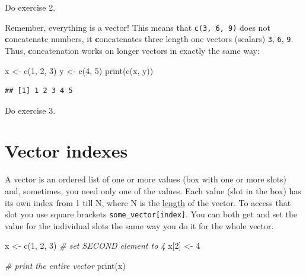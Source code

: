 \documentclass[
]{book}
\newenvironment{Shaded}{\begin{snugshade}}{\end{snugshade}}
\newcommand{\CommentTok}[1]{\textcolor[rgb]{0.56,0.35,0.01}{\textit{#1}}}
\newcommand{\DecValTok}[1]{\textcolor[rgb]{0.00,0.00,0.81}{#1}}
\newcommand{\FunctionTok}[1]{\textcolor[rgb]{0.00,0.00,0.00}{#1}}
\newcommand{\NormalTok}[1]{#1}
\newcommand{\OtherTok}[1]{\textcolor[rgb]{0.56,0.35,0.01}{#1}}
\begin{document}
Do exercise 2.

Remember, everything is a vector! This means that \texttt{c(3,\ 6,\ 9)} does not \textbf{c}oncatenate numbers, it \textbf{c}oncatenates three length one vectors (scalars) \texttt{3}, \texttt{6}, \texttt{9}. Thus, \textbf{c}oncatenation works on longer vectors in exactly the same way:

\begin{Shaded}
\begin{Highlighting}[]
\NormalTok{x }\OtherTok{\textless{}{-}} \FunctionTok{c}\NormalTok{(}\DecValTok{1}\NormalTok{, }\DecValTok{2}\NormalTok{, }\DecValTok{3}\NormalTok{)}
\NormalTok{y }\OtherTok{\textless{}{-}} \FunctionTok{c}\NormalTok{(}\DecValTok{4}\NormalTok{, }\DecValTok{5}\NormalTok{)}
\FunctionTok{print}\NormalTok{(}\FunctionTok{c}\NormalTok{(x, y))}
\end{Highlighting}
\end{Shaded}

\begin{verbatim}
## [1] 1 2 3 4 5
\end{verbatim}

Do exercise 3.

\hypertarget{vector-index}{%
\section{Vector indexes}\label{vector-index}}

A vector is an ordered list of one or more values (box with one or more slots) and, sometimes, you need only one of the values. Each value (slot in the box) has its own index from 1 till N, where N is the \href{https://www.rdocumentation.org/packages/base/versions/3.6.2/topics/length}{length} of the vector. To access that slot you use square brackets \texttt{some\_vector{[}index{]}}. You can both get and set the value for the individual slots the same way you do it for the whole vector.

\begin{Shaded}
\begin{Highlighting}[]
\NormalTok{x }\OtherTok{\textless{}{-}} \FunctionTok{c}\NormalTok{(}\DecValTok{1}\NormalTok{, }\DecValTok{2}\NormalTok{, }\DecValTok{3}\NormalTok{)}
\CommentTok{\# set SECOND element to 4}
\NormalTok{x[}\DecValTok{2}\NormalTok{] }\OtherTok{\textless{}{-}} \DecValTok{4}

\CommentTok{\# print the entire vector}
\FunctionTok{print}\NormalTok{(x)}
\end{Highlighting}
\end{Shaded}
\end{document}
